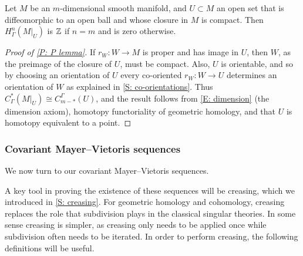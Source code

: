 \begin{proposition}\label{P: P lemma}
	Let $M$ be an $m$-dimensional smooth manifold, and $U \subset M$ an open set that is diffeomorphic to an open ball and whose closure in $M$ is compact.
	Then $H^n_\Gamma(M|_U)$ is $\mathbb{Z}$ if $n = m$ and is zero otherwise.
\end{proposition}


\begin{proof}[Proof of \cref{P: P lemma}]
	If $r_W \colon W \to M$ is proper and has image in $U$, then $W$, as the preimage of the closure of $U$, must be compact.
	Also, $U$ is orientable, and so by choosing an orientation of $U$ every co-oriented $r_W \colon W \to U$ determines an orientation of $W$ as explained in \cref{S: co-orientations}.
	Thus $C^*_\Gamma(M|_U) \cong C_{m-*}^\Gamma(U)$, and the result follows from \cref{E: dimension} (the dimension axiom), homotopy functoriality of geometric homology, and that $U$ is homotopy equivalent to a point.
\end{proof}



\subsubsection{Covariant Mayer--Vietoris sequences}

We now turn to our covariant Mayer--Vietoris sequences.


A key tool in proving the existence of these sequences will be creasing, which we introduced in \cref{S: creasing}.
For geometric homology and cohomology, creasing replaces the role that subdivision plays in the classical singular theories.
In some sense creasing is simpler, as creasing only needs to be applied once while subdivision often needs to be iterated.
In order to perform creasing, the following definitions will be useful.

